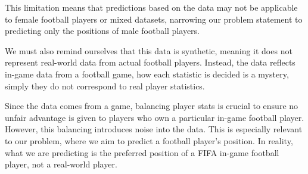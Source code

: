 This limitation means that predictions based on the data may not be applicable to female football players or mixed datasets, narrowing our problem statement to predicting only the positions of male football players.
\par
We must also remind ourselves that this data is synthetic, meaning it does not represent real-world data from actual football players.  
Instead, the data reflects in-game data from a football game, how each statistic is decided is a mystery, simply they do not correspond to real player statistics.
\par
Since the data comes from a game, balancing player stats is crucial to ensure no unfair advantage is given to players who own a particular in-game football player.
However, this balancing introduces noise into the data.
This is especially relevant to our problem, where we aim to predict a football player’s position. In reality, what we are predicting is the preferred position of a FIFA in-game football player, not a real-world player.





